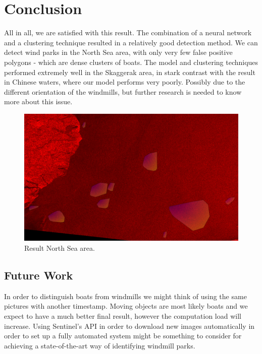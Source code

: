 \section{Conclusion}
%


All in all, we are satisfied with this result. The combination of a neural network and a clustering technique resulted in a relatively good detection method. We can detect wind parks in the North Sea area, with only very few false positive polygons - which are dense clusters of boats. The model and clustering techniques performed extremely well in the Skaggerak area, in stark contrast with the result in Chinese waters, where our model performs very poorly. Possibly due to the different orientation of the windmills, but further research is needed to know more about this issue.


\begin{figure}[ht]
\begin{center}
\centerline{\includegraphics[width=\columnwidth]{images/result_northsea.png}}
\caption{Result North Sea area.}
\label{noise-reduction}
\end{center}
\end{figure}

\subsection{Future Work}
In order to distinguish boats from windmills we might think of using the same pictures with another timestamp. Moving objects are most likely boats and we expect to have a much better final result, however the computation load will increase. Using Sentinel's API in order to download new images automatically in order to set up a fully automated system might be something to consider for achieving a state-of-the-art way of identifying windmill parks.

